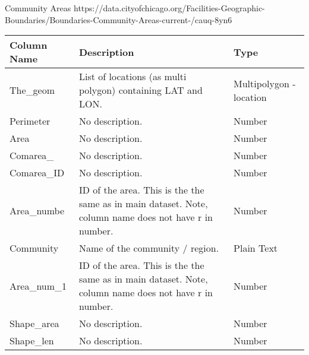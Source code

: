 Community Areas \newline
https://data.cityofchicago.org/Facilities-Geographic-Boundaries/Boundaries-Community-Areas-current-/cauq-8yn6
\begin{longtable}{|m{6em}|m{18em}|m{7em}|}
    \hline
    Column Name & 
    Description & 
    Type\\
    \hline
    The\_geom & 
    List of locations (as multi polygon) containing LAT and LON. & 
    Multipolygon - location\\
    \hline
    Perimeter & 
    No description. & 
    Number\\
    \hline
    Area & 
    No description. & 
    Number\\
    \hline
    Comarea\_ & 
    No description. & 
    Number\\
    \hline
    Comarea\_ID & 
    No description. & 
    Number\\
    \hline
    Area\_numbe & 
    ID of the area. This is the the same as in main dataset. Note, column name does not have r in number. & 
    Number\\
    \hline
    Community & 
    Name of the community / region. & 
    Plain Text\\
    \hline
    Area\_num\_1 & 
    ID of the area. This is the the same as in main dataset. Note, column name does not have r in number. & 
    Number\\
    \hline
    Shape\_area & 
    No description. & 
    Number\\
    \hline
    Shape\_len & 
    No description. & 
    Number\\
    \hline
\end{longtable}

